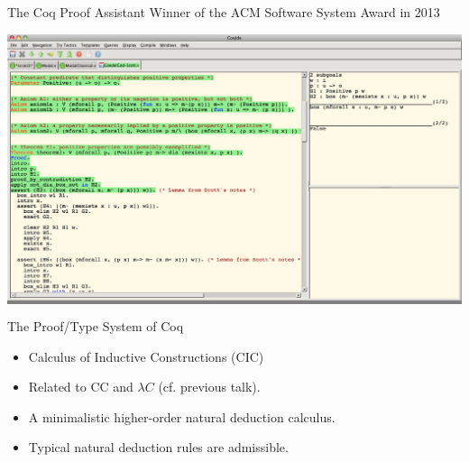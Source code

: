 
\begin{frame}{The Coq Proof Assistant}
{Winner of the ACM Software System Award in 2013}
\begin{changemargin}{-1cm}{-1cm}
\colorbox{gray}{\includegraphics[width=1.17\textwidth]{Images/Demos/CoqDemo.png}}
\end{changemargin}
\end{frame}

\begin{frame}{The Proof/Type System of Coq}
\begin{itemize}
\item Calculus of Inductive Constructions (CIC)
\item Related to CC and $\lambda C$ (cf. previous talk).
\item A minimalistic higher-order natural deduction calculus.
\item Typical natural deduction rules are admissible.
\end{itemize}
\end{frame}

